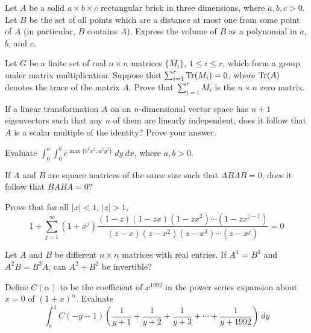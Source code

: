 \documentclass[12pt]{article}
\begin{document}
    \begin{exercise}[1984 A1]
        Let $A$ be a solid $a\times b\times c $ rectangular brick in three dimensions, where $a,b,c>0$. Let $B$ be the set of all points which are a distance at most one from some point of $A$ (in particular, $B$ contains $A$). Express the volume of $B$ as a polynomial in $a$, $b$, and $c$.
    \end{exercise}

    \begin{exercise}[1985 B6]
        Let $G$ be a finite set of real $n \times n$ matrices $\{M_i\}$, $1 \leqslant i \leqslant r$, which form a group under matrix multiplication. Suppose that $\sum_{i=1}^r \operatorname{Tr} (M_i) = 0$, where $\operatorname{Tr} (A)$ denotes the trace of the matrix $A$. Prove that $\sum_{i=1}^r M_i$ is the $n \times n$ zero matrix.
    \end{exercise}

    \begin{exercise}[1988 A6]
        If a linear transformation $A$ on an $n$-dimensional vector space has $n+1$ eigenvectors such that any $n$ of them are linearly independent, does it follow that $A$ is a scalar multiple of the identity? Prove your answer.  
    \end{exercise}

    \begin{exercise}[1989 A2]
        Evaluate $\int_0^a \int_0^b e^{\max\{b^2x^2,a^2y^2\}}\ dy\ dx$, where $a,b>0$.
    \end{exercise}

    \begin{exercise}[1990 A5]
        If $A$ and $B$ are square matrices of the same size such that $ABAB = 0$, does it follow that $BABA = 0$?
    \end{exercise}

    \begin{exercise}[1990 B2]
        Prove that for all $|x|<1$, $|z|>1$, 
        \[1+\sum_{j=1}^\infty (1+x^j)\frac{(1-z)(1-zx)(1-zx^2)\cdots(1-zx^{j-1})}{(z-x)(z-x^2)(z-x^3)\cdots(z-x^j)} = 0\]
    \end{exercise}

    \begin{exercise}[1991 A2]
        Let $A$ and $B$ be different $n \times n$ matrices with real entries. If $A^{3}$ = $B^{3}$ and $A^{2}B = B^{2}A$, can $A^{2} + B^{2}$ be invertible?
    \end{exercise}

    \begin{exercise}[1992 A2]
        Define $C(\alpha)$ to be the coefficient of $x^{1992}$ in the power series expansion about $x=0$ of $(1+x)^\alpha$. Evaluate
        \[\int_0^1 C(-y-1)\left(\frac{1}{y+1}+\frac{1}{y+2}+\frac{1}{y+3}+\cdots + \frac{1}{y+1992}\right)\ dy\]
    \end{exercise}
\end{document}
